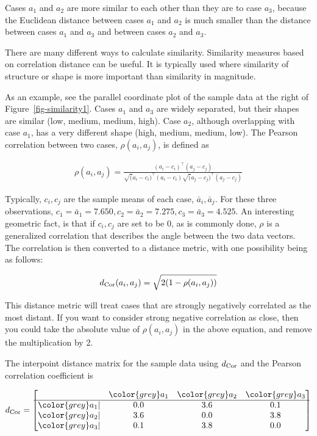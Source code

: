\documentclass[
  letterpaper,
]{book}
\begin{document}
\noindent Cases \(a_1\) and \(a_2\) are more similar to each other than
they are to case \(a_3\), because the Euclidean distance between cases
\(a_1\) and \(a_2\) is much smaller than the distance between cases
\(a_1\) and \(a_3\) and between cases \(a_2\) and \(a_3\).

There are many different ways to calculate similarity. Similarity
measures based on correlation distance can be useful. It is typically
used where similarity of structure or shape is more important than
similarity in magnitude.


As an example, see the parallel coordinate plot of the sample data at
the right of Figure~\ref{fig-similarity1}. Cases \(a_1\) and \(a_3\) are
widely separated, but their shapes are similar (low, medium, medium,
high). Case \(a_2\), although overlapping with case \(a_1\), has a very
different shape (high, medium, medium, low). The Pearson correlation
between two cases, \(\rho(a_i,a_j)\), is defined as

\begin{align*}
\rho(a_i,a_j) = \frac{(a_i-c_i)^\top(a_j-c_j)}
{\sqrt(a_i-c_i)^\top(a_i-c_i) \sqrt(a_j-c_j)^\top(a_j-c_j)}
\label{corc}
\end{align*}

\noindent Typically, \(c_i, c_j\) are the sample means of each case,
\(\bar{a}_i,\bar{a}_j\). For these three observations,
\(c_1=\bar{a}_1=7.650, c_2=\bar{a}_2=7.275, c_3=\bar{a}_3=4.525\). An
interesting geometric fact, is that if \(c_i, c_j\) are set to be 0, as
is commonly done, \(\rho\) is a generalized correlation that describes
the angle between the two data vectors. The correlation is then
converted to a distance metric, with one possibility being as follows:

\begin{align*}
d_{\rm Cor}(a_i,a_j) = \sqrt{2(1-\rho(a_i,a_j))}
\end{align*}

This distance metric will treat cases that are strongly negatively
correlated as the most distant. If you want to consider strong negative
correlation as close, then you could take the absolute value of
\(\rho(a_i,a_j)\) in the above equation, and remove the multiplication
by 2.

The interpoint distance matrix for the sample data using \(d_{\rm Cor}\)
and the Pearson correlation coefficient is

\begin{align*}
d_{\rm Cor} = \begin{bmatrix}
& {\color{grey} a_1} & {\color{grey} a_2} & {\color{grey} a_3} \\\hline
{\color{grey} a_1} | & 0.0 & 3.6 & 0.1 \\
{\color{grey} a_2} | & 3.6 & 0.0 & 3.8 \\
{\color{grey} a_3} | & 0.1 & 3.8 & 0.0
\end{bmatrix}
\end{align*}
\end{document}

